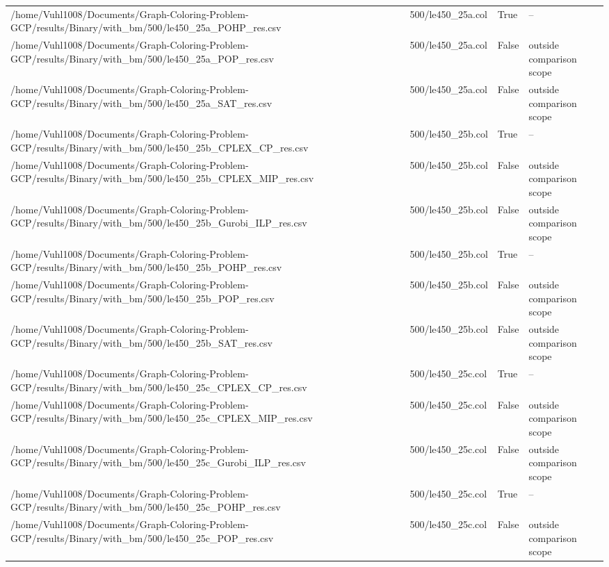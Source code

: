 \begin{table}[htbp]
\begin{tabular}{llll}
/home/Vuhl1008/Documents/Graph-Coloring-Problem-GCP/results/Binary/with\_bm/500/le450\_25a\_POHP\_res.csv & 500/le450\_25a.col & True & -- \\
/home/Vuhl1008/Documents/Graph-Coloring-Problem-GCP/results/Binary/with\_bm/500/le450\_25a\_POP\_res.csv & 500/le450\_25a.col & False & outside comparison scope \\
/home/Vuhl1008/Documents/Graph-Coloring-Problem-GCP/results/Binary/with\_bm/500/le450\_25a\_SAT\_res.csv & 500/le450\_25a.col & False & outside comparison scope \\
/home/Vuhl1008/Documents/Graph-Coloring-Problem-GCP/results/Binary/with\_bm/500/le450\_25b\_CPLEX\_CP\_res.csv & 500/le450\_25b.col & True & -- \\
/home/Vuhl1008/Documents/Graph-Coloring-Problem-GCP/results/Binary/with\_bm/500/le450\_25b\_CPLEX\_MIP\_res.csv & 500/le450\_25b.col & False & outside comparison scope \\
/home/Vuhl1008/Documents/Graph-Coloring-Problem-GCP/results/Binary/with\_bm/500/le450\_25b\_Gurobi\_ILP\_res.csv & 500/le450\_25b.col & False & outside comparison scope \\
/home/Vuhl1008/Documents/Graph-Coloring-Problem-GCP/results/Binary/with\_bm/500/le450\_25b\_POHP\_res.csv & 500/le450\_25b.col & True & -- \\
/home/Vuhl1008/Documents/Graph-Coloring-Problem-GCP/results/Binary/with\_bm/500/le450\_25b\_POP\_res.csv & 500/le450\_25b.col & False & outside comparison scope \\
/home/Vuhl1008/Documents/Graph-Coloring-Problem-GCP/results/Binary/with\_bm/500/le450\_25b\_SAT\_res.csv & 500/le450\_25b.col & False & outside comparison scope \\
/home/Vuhl1008/Documents/Graph-Coloring-Problem-GCP/results/Binary/with\_bm/500/le450\_25c\_CPLEX\_CP\_res.csv & 500/le450\_25c.col & True & -- \\
/home/Vuhl1008/Documents/Graph-Coloring-Problem-GCP/results/Binary/with\_bm/500/le450\_25c\_CPLEX\_MIP\_res.csv & 500/le450\_25c.col & False & outside comparison scope \\
/home/Vuhl1008/Documents/Graph-Coloring-Problem-GCP/results/Binary/with\_bm/500/le450\_25c\_Gurobi\_ILP\_res.csv & 500/le450\_25c.col & False & outside comparison scope \\
/home/Vuhl1008/Documents/Graph-Coloring-Problem-GCP/results/Binary/with\_bm/500/le450\_25c\_POHP\_res.csv & 500/le450\_25c.col & True & -- \\
/home/Vuhl1008/Documents/Graph-Coloring-Problem-GCP/results/Binary/with\_bm/500/le450\_25c\_POP\_res.csv & 500/le450\_25c.col & False & outside comparison scope \\

\end{tabular}
\end{table}
